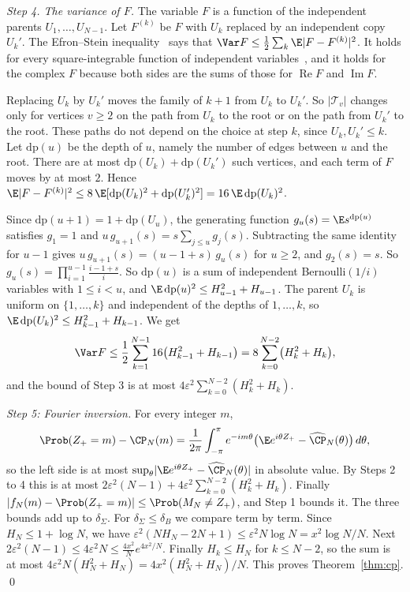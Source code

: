 \emph{Step 4. The variance of $F$.} The variable $F$ is a function of the
independent parents $U_1,\dots,U_{N-1}$. Let $F^{(k)}$ be $F$ with $U_k$
replaced by an independent copy $U_k'$. The Efron--Stein
inequality~\cite{efronstein1981} says that
$\Var F\le\frac12\sum_k\E\lvert F-F^{(k)}\rvert^2$. It holds for every square-integrable
function of independent variables~\cite{steele1986}, and it holds for the complex $F$ because
both sides are the sums of those for $\operatorname{Re}F$ and $\operatorname{Im}F$.

Replacing $U_k$ by $U_k'$ moves the family of $k+1$ from $U_k$ to $U_k'$. So
$\lvert\mathcal T_v\rvert$ changes only for vertices $v\ge2$ on the path from
$U_k$ to the root or on the path from $U_k'$ to the root. These paths do not
depend on the choice at step $k$, since $U_k,U_k'\le k$. Let $\mathrm{dp}(u)$
be the depth of $u$, namely the number of edges between $u$ and the root.
There are at most $\mathrm{dp}(U_k)+\mathrm{dp}(U_k')$ such vertices, and each
term of $F$ moves by at most $2$. Hence
$\E\lvert F-F^{(k)}\rvert^2\le8\,\E[\mathrm{dp}(U_k)^2+\mathrm{dp}(U_k')^2]
=16\,\E\,\mathrm{dp}(U_k)^2$.

Since $\mathrm{dp}(u+1)=1+\mathrm{dp}(U_u)$, the generating function
$g_u(s)=\E s^{\mathrm{dp}(u)}$ satisfies $g_1=1$ and
$u\,g_{u+1}(s)=s\sum_{j\le u}g_j(s)$. Subtracting the same identity for $u-1$
gives $u\,g_{u+1}(s)=(u-1+s)\,g_u(s)$ for $u\ge2$, and $g_2(s)=s$. So
$g_u(s)=\prod_{i=1}^{u-1}\frac{i-1+s}{i}$. So $\mathrm{dp}(u)$ is a sum of
independent Bernoulli$(1/i)$ variables with $1\le i<u$, and
$\E\,\mathrm{dp}(u)^2\le H_{u-1}^2+H_{u-1}$. The parent $U_k$ is uniform on
$\{1,\dots,k\}$ and independent of the depths of $1,\dots,k$, so
$\E\,\mathrm{dp}(U_k)^2\le H_{k-1}^2+H_{k-1}$. We get
\[
 \Var F\le\frac12\sum_{k=1}^{N-1}16\bigl(H_{k-1}^2+H_{k-1}\bigr)
 =8\sum_{k=0}^{N-2}\bigl(H_k^2+H_k\bigr),
\]
and the bound of Step 3 is at most $4\varepsilon^2\sum_{k=0}^{N-2}(H_k^2+H_k)$.

\emph{Step 5: Fourier inversion.} For every integer $m$,
\[
 \Prob(Z_+=m)-\CP_N(m)=\frac1{2\pi}\int_{-\pi}^{\pi}e^{-im\theta}
 \bigl(\E e^{i\theta Z_+}-\widehat{\CP}_N(\theta)\bigr)\,d\theta,
\]
so the left side is at most
$\sup_\theta\lvert\E e^{i\theta Z_+}-\widehat{\CP}_N(\theta)\rvert$ in absolute
value. By Steps 2 to 4 this is at most
$2\varepsilon^2(N-1)+4\varepsilon^2\sum_{k=0}^{N-2}(H_k^2+H_k)$. Finally
$\lvert f_N(m)-\Prob(Z_+=m)\rvert\le\Prob(M_N\ne Z_+)$, and Step 1 bounds it.
The three bounds add up to $\delta_\Sigma$. For $\delta_\Sigma\le\delta_B$ we compare term by
term. Since $H_N\le1+\log N$, we have $\varepsilon^2(NH_N-2N+1)\le\varepsilon^2N\log N=x^2\log N/N$.
Next $2\varepsilon^2(N-1)\le4\varepsilon^2N\le\frac{4x^2}Ne^{4x^2/N}$. Finally
$H_k\le H_N$ for $k\le N-2$, so the sum is at most $4\varepsilon^2N(H_N^2+H_N)=4x^2(H_N^2+H_N)/N$.
This proves Theorem~\ref{thm:cp}. \qed
